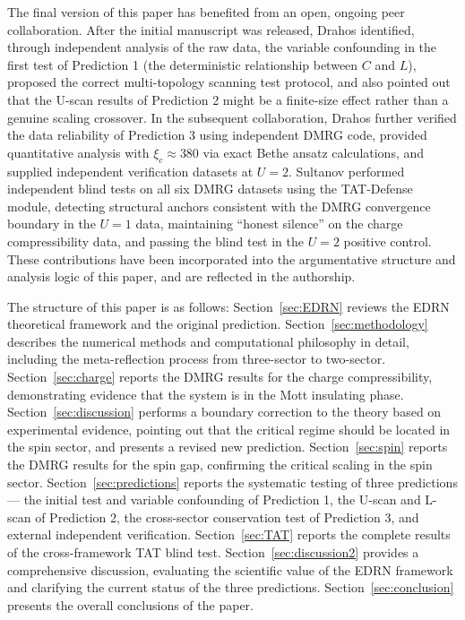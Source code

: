 \documentclass[prb,reprint,twocolumn,superscriptaddress]{revtex4-2}
\begin{document}
The final version of this paper has benefited from an open, ongoing peer collaboration. After the initial manuscript was released, Drahos identified, through independent analysis of the raw data, the variable confounding in the first test of Prediction 1 (the deterministic relationship between $C$ and $L$), proposed the correct multi-topology scanning test protocol, and also pointed out that the U-scan results of Prediction 2 might be a finite-size effect rather than a genuine scaling crossover. In the subsequent collaboration, Drahos further verified the data reliability of Prediction 3 using independent DMRG code, provided quantitative analysis with $\xi_c \approx 380$ via exact Bethe ansatz calculations, and supplied independent verification datasets at $U=2$. Sultanov performed independent blind tests on all six DMRG datasets using the TAT-Defense module, detecting structural anchors consistent with the DMRG convergence boundary in the $U=1$ data, maintaining ``honest silence'' on the charge compressibility data, and passing the blind test in the $U=2$ positive control. These contributions have been incorporated into the argumentative structure and analysis logic of this paper, and are reflected in the authorship.

The structure of this paper is as follows: Section~\ref{sec:EDRN} reviews the EDRN theoretical framework and the original prediction. Section~\ref{sec:methodology} describes the numerical methods and computational philosophy in detail, including the meta-reflection process from three-sector to two-sector. Section~\ref{sec:charge} reports the DMRG results for the charge compressibility, demonstrating evidence that the system is in the Mott insulating phase. Section~\ref{sec:discussion} performs a boundary correction to the theory based on experimental evidence, pointing out that the critical regime should be located in the spin sector, and presents a revised new prediction. Section~\ref{sec:spin} reports the DMRG results for the spin gap, confirming the critical scaling in the spin sector. Section~\ref{sec:predictions} reports the systematic testing of three predictions --- the initial test and variable confounding of Prediction 1, the U-scan and L-scan of Prediction 2, the cross-sector conservation test of Prediction 3, and external independent verification. Section~\ref{sec:TAT} reports the complete results of the cross-framework TAT blind test. Section~\ref{sec:discussion2} provides a comprehensive discussion, evaluating the scientific value of the EDRN framework and clarifying the current status of the three predictions. Section~\ref{sec:conclusion} presents the overall conclusions of the paper.
\end{document}
